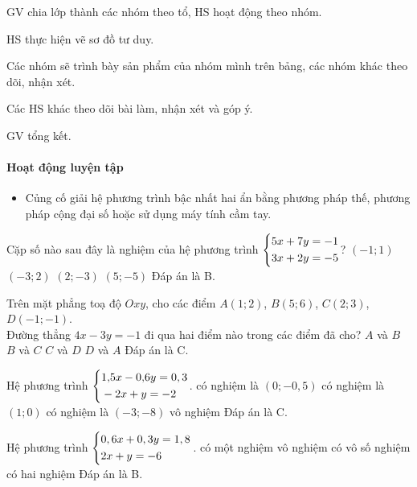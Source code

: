 \tochucthuchien

\begin{tcth}
	\buocmot
	\item GV chia lớp thành các nhóm theo tổ, HS hoạt động theo nhóm.
	\buochai
	\item HS thực hiện vẽ sơ đồ tư duy.
	\buocba
	\item Các nhóm sẽ trình bày sản phẩm của nhóm mình trên	bảng, các nhóm khác theo dõi,
	nhận xét.
	\item Các HS khác theo dõi bài làm, nhận xét và góp ý.
	\buocbon
	\item GV tổng kết.
\end{tcth}

\paragraph{Hoạt động luyện tập}

\muctieu

\begin{itemize}
	\item Củng cố giải hệ phương trình bậc nhất hai ẩn bằng phương pháp thế, phương pháp cộng đại số hoặc sử dụng máy tính cầm tay.
\end{itemize}

\noidungsanpham

\begin{baitap}[1.19]
	Cặp số nào sau đây là nghiệm của hệ phương trình $\left\{\begin{aligned}&5x+7y=-1\\&3x+2y=-5\end{aligned}\right.$?
	\choice
	{$(-1;1)$}
	{$(-3;2)$}
	{$(2;-3)$}
	{$(5;-5)$}
	\doicot
	Đáp án là B.
\end{baitap}

\begin{baitap}[1.20]
	Trên mặt phẳng toạ độ $Oxy$, cho các điểm $A(1; 2)$, $B(5; 6)$, $C(2; 3)$, $D(-1; -1)$.\\
	Đường thẳng $4x - 3y = -1$ đi qua hai điểm nào trong các điểm đã cho?
	\choice
	{$A$ và $B$}
	{$B$ và $C$}
	{$C$ và $D$}
	{$D$ và $A$}
	\doicot
	Đáp án là C.
\end{baitap}

\begin{baitap}[1.21]
	Hệ phương trình $\left\{\begin{aligned}&1{,}5x - 0{,}6y = 0,3 \\ &-2x + y = -2\end{aligned}\right.$.
	\choice
	{có nghiệm là $(0; -0,5)$}
	{có nghiệm là $(1; 0)$}
	{có nghiệm là $(-3; -8)$}
	{vô nghiệm}
	\doicot
	Đáp án là C.
\end{baitap}

\begin{baitap}[1.22]
	Hệ phương trình $\left\{\begin{aligned}&0,6x + 0,3y = 1,8 \\ &2x + y = -6\end{aligned}\right.$.
	\choice
	{có một nghiệm}
	{vô nghiệm}
	{có vô số nghiệm}
	{có hai nghiệm}
	\doicot
	Đáp án là B.
\end{baitap}

